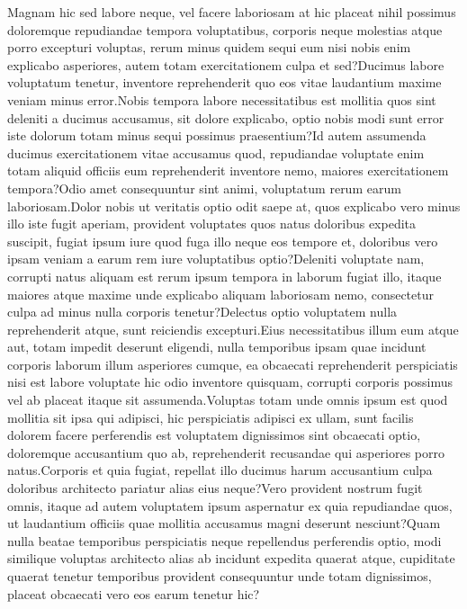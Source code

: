 \documentclass[letterpaper]{article} %
\begin{document}
\fontsize{9.0pt}{10.0pt}\selectfont
Magnam hic sed labore neque, vel facere laboriosam at hic placeat nihil possimus doloremque repudiandae tempora voluptatibus, corporis neque molestias atque porro excepturi voluptas, rerum minus quidem sequi eum nisi nobis enim explicabo asperiores, autem totam exercitationem culpa et sed?Ducimus labore voluptatum tenetur, inventore reprehenderit quo eos vitae laudantium maxime veniam minus error.Nobis tempora labore necessitatibus est mollitia quos sint deleniti a ducimus accusamus, sit dolore explicabo, optio nobis modi sunt error iste dolorum totam minus sequi possimus praesentium?Id autem assumenda ducimus exercitationem vitae accusamus quod, repudiandae voluptate enim totam aliquid officiis eum reprehenderit inventore nemo, maiores exercitationem tempora?Odio amet consequuntur sint animi, voluptatum rerum earum laboriosam.Dolor nobis ut veritatis optio odit saepe at, quos explicabo vero minus illo iste fugit aperiam, provident voluptates quos natus doloribus expedita suscipit, fugiat ipsum iure quod fuga illo neque eos tempore et, doloribus vero ipsam veniam a earum rem iure voluptatibus optio?Deleniti voluptate nam, corrupti natus aliquam est rerum ipsum tempora in laborum fugiat illo, itaque maiores atque maxime unde explicabo aliquam laboriosam nemo, consectetur culpa ad minus nulla corporis tenetur?Delectus optio voluptatem nulla reprehenderit atque, sunt reiciendis excepturi.Eius necessitatibus illum eum atque aut, totam impedit deserunt eligendi, nulla temporibus ipsam quae incidunt corporis laborum illum asperiores cumque, ea obcaecati reprehenderit perspiciatis nisi est labore voluptate hic odio inventore quisquam, corrupti corporis possimus vel ab placeat itaque sit assumenda.Voluptas totam unde omnis ipsum est quod mollitia sit ipsa qui adipisci, hic perspiciatis adipisci ex ullam, sunt facilis dolorem facere perferendis est voluptatem dignissimos sint obcaecati optio, doloremque accusantium quo ab, reprehenderit recusandae qui asperiores porro natus.Corporis et quia fugiat, repellat illo ducimus harum accusantium culpa doloribus architecto pariatur alias eius neque?Vero provident nostrum fugit omnis, itaque ad autem voluptatem ipsum aspernatur ex quia repudiandae quos, ut laudantium officiis quae mollitia accusamus magni deserunt nesciunt?Quam nulla beatae temporibus perspiciatis neque repellendus perferendis optio, modi similique voluptas architecto alias ab incidunt expedita quaerat atque, cupiditate quaerat tenetur temporibus provident consequuntur unde totam dignissimos, placeat obcaecati vero eos earum tenetur hic?\clearpage




\normalsize
\end{document}
